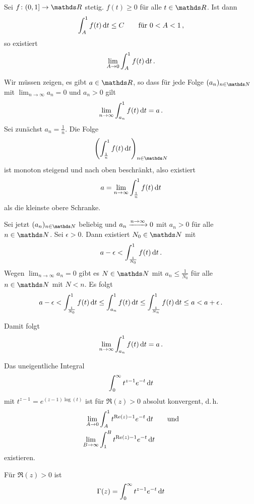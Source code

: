 \begin{lemm}\label{lemma:majoranten-int}
Sei $f\colon (0,1] \ra \RR$ stetig. $f(t) \geq 0$ für alle $t \in\RR$.
Ist dann
\[
	\int_A^1 f(t) \,\mathrm{d} t
	\leq C
	\qquad \text{für } 0 < A < 1
	\,,
\]
so existiert
\[
	\lim_{A\to 0} \int_A^1 f(t) \,\mathrm{d} t
	\,.
\]
\end{lemm}
\begin{bewe}
Wir müssen zeigen, es gibt $a \in \RR$, so dass für jede Folge $(a_n)_{n\in\NN}$ mit $\lim_{n\to\infty} a_n = 0$ und $a_n > 0$ gilt
\[
	\lim_{n\to\infty} \int_{a_n}^1 f(t) \,\mathrm{d} t
	= a
	\,.
\]
Sei zunächst $a_n = \frac{1}{n}$. Die Folge
\[
	\left(\int_{\frac{1}{n}}^1 f(t) \opd t\right)_{n\in\NN}
\]
ist monoton steigend und nach oben beschränkt, also existiert
\[
	a = \lim_{n\to\infty} \int_{\frac{1}{n}}^1 f(t) \,\mathrm{d} t
\]
als die kleinste obere Schranke.

Sei jetzt $(a_n)_{n\in\NN}$ beliebig und $a_n \xrightarrow{n\to\infty} 0$ mit $a_n > 0$ für alle $n\in\NN$.
Sei $\epsilon > 0$.
Dann existiert $N_0 \in \NN$ mit
\[
	a - \epsilon
	< \int_{\frac{1}{N_0}}^1 f(t) \,\mathrm{d} t
	\,.
\]
Wegen $\lim_{n\to\infty} a_n = 0$ gibt es $N\in\NN$ mit $a_n \leq \frac{1}{N_0}$ für alle $n\in\NN$ mit $N < n$.
Es folgt
\[
	a - \epsilon
	< \int_{\frac{1}{N_0}}^1 f(t)\,\mathrm{d} t
	\leq \int_{a_n}^1 f(t)\,\mathrm{d} t
	\leq \int^1_{\frac{1}{N_n}} f(t)\,\mathrm{d} t
	\leq a
	< a+\epsilon
	\,.
\]

Damit folgt
\[
	\lim_{n\to\infty} \int_{a_n}^1 f(t) \,\mathrm{d} t
	= a
	\,.
\]
\end{bewe}

\begin{satz-list}\label{satz:eulerint}
\item Das uneigentliche Integral
\[
	\int_0^\infty t^{z-1}e^{-t} \,\mathrm{d} t
\]
mit $t^{z-1} = e^{(z-1)\log(t)}$ ist für $\Re(z) > 0$ absolut konvergent, d.\,h.
\begin{align*}
	\lim_{A\to 0} &\int_A^1 t^{\mathrm{Re}(z)-1}e^{-t} \,\mathrm{d} t
	\qquad \text{und} \\
	\lim_{B\to\infty} &\int_1^B t^{\mathrm{Re}(z)-1}e^{-t} \,\mathrm{d} t
\end{align*}
existieren.

\item Für $\Re(z) > 0$ ist
\[
	\Gamma(z) = \int_0^\infty t^{z-1}e^{-t} \,\mathrm{d} t
\]
\end{satz-list}

